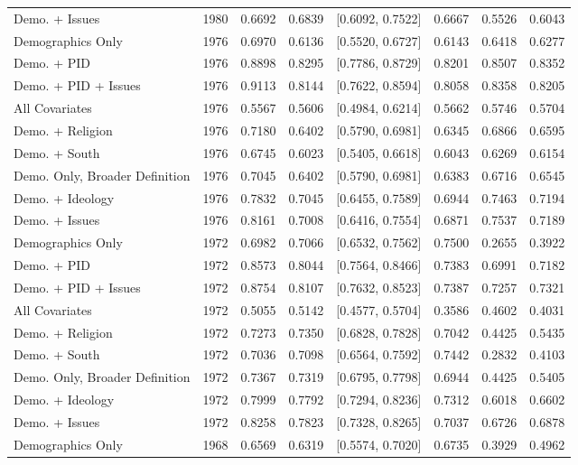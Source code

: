 \begin{longtable}{lrrrlrrr}
  Demo. + Issues & 1980 & 0.6692 & 0.6839 & [0.6092, 0.7522] & 0.6667 & 0.5526 & 0.6043 \\ 
  Demographics Only & 1976 & 0.6970 & 0.6136 & [0.5520, 0.6727] & 0.6143 & 0.6418 & 0.6277 \\ 
  Demo. + PID & 1976 & 0.8898 & 0.8295 & [0.7786, 0.8729] & 0.8201 & 0.8507 & 0.8352 \\ 
  Demo. + PID + Issues & 1976 & 0.9113 & 0.8144 & [0.7622, 0.8594] & 0.8058 & 0.8358 & 0.8205 \\ 
  All Covariates & 1976 & 0.5567 & 0.5606 & [0.4984, 0.6214] & 0.5662 & 0.5746 & 0.5704 \\ 
  Demo. + Religion & 1976 & 0.7180 & 0.6402 & [0.5790, 0.6981] & 0.6345 & 0.6866 & 0.6595 \\ 
  Demo. + South & 1976 & 0.6745 & 0.6023 & [0.5405, 0.6618] & 0.6043 & 0.6269 & 0.6154 \\ 
  Demo. Only, Broader Definition & 1976 & 0.7045 & 0.6402 & [0.5790, 0.6981] & 0.6383 & 0.6716 & 0.6545 \\ 
  Demo. + Ideology & 1976 & 0.7832 & 0.7045 & [0.6455, 0.7589] & 0.6944 & 0.7463 & 0.7194 \\ 
  Demo. + Issues & 1976 & 0.8161 & 0.7008 & [0.6416, 0.7554] & 0.6871 & 0.7537 & 0.7189 \\ 
  Demographics Only & 1972 & 0.6982 & 0.7066 & [0.6532, 0.7562] & 0.7500 & 0.2655 & 0.3922 \\ 
  Demo. + PID & 1972 & 0.8573 & 0.8044 & [0.7564, 0.8466] & 0.7383 & 0.6991 & 0.7182 \\ 
  Demo. + PID + Issues & 1972 & 0.8754 & 0.8107 & [0.7632, 0.8523] & 0.7387 & 0.7257 & 0.7321 \\ 
  All Covariates & 1972 & 0.5055 & 0.5142 & [0.4577, 0.5704] & 0.3586 & 0.4602 & 0.4031 \\ 
  Demo. + Religion & 1972 & 0.7273 & 0.7350 & [0.6828, 0.7828] & 0.7042 & 0.4425 & 0.5435 \\ 
  Demo. + South & 1972 & 0.7036 & 0.7098 & [0.6564, 0.7592] & 0.7442 & 0.2832 & 0.4103 \\ 
  Demo. Only, Broader Definition & 1972 & 0.7367 & 0.7319 & [0.6795, 0.7798] & 0.6944 & 0.4425 & 0.5405 \\ 
  Demo. + Ideology & 1972 & 0.7999 & 0.7792 & [0.7294, 0.8236] & 0.7312 & 0.6018 & 0.6602 \\ 
  Demo. + Issues & 1972 & 0.8258 & 0.7823 & [0.7328, 0.8265] & 0.7037 & 0.6726 & 0.6878 \\ 
  Demographics Only & 1968 & 0.6569 & 0.6319 & [0.5574, 0.7020] & 0.6735 & 0.3929 & 0.4962 \\ 

\end{longtable}
